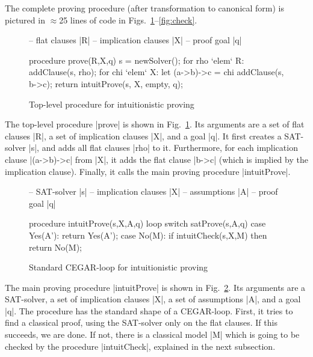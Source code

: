 \documentclass{llncs}
\begin{document}
The complete proving procedure (after transformation to canonical form) is pictured in $\approx$25 lines of code in Figs.\ \ref{fig:top-level}--\ref{fig:check}.

\begin{figure}[t]
\begin{center}
\begin{code}
-- flat clauses |R|
-- implication clauses |X|
-- proof goal |q|

procedure prove(R,X,q)
  s = newSolver();
  for rho `elem` R:
    addClause(s, rho);
  for chi `elem` X:
    let (a->b)->c = chi
    addClause(s, b->c);
  return intuitProve(s, X, empty, q);
\end{code}
\vspace{-0.7cm}\end{center}
\caption{Top-level procedure for intuitionistic proving}
\label{fig:top-level}
\end{figure}

The top-level procedure |prove| is shown in Fig.\ \ref{fig:top-level}. Its arguments are a set of flat clauses |R|, a set of implication clauses |X|, and a goal |q|. It first creates a SAT-solver |s|, and adds all flat clauses |rho| to it. Furthermore, for each implication clause |(a->b)->c| from |X|, it adds the flat clause |b->c| (which is implied by the implication clause). Finally, it calls the main proving procedure |intuitProve|.

\begin{figure}[t]
\begin{center}
\begin{code}
-- SAT-solver |s|
-- implication clauses |X|
-- assumptions |A|
-- proof goal |q|

procedure intuitProve(s,X,A,q)
  loop
    switch satProve(s,A,q)
      case Yes(A'):
        return Yes(A');
      case No(M):
        if intuitCheck(s,X,M) then
          return No(M);
\end{code}
\vspace{-0.7cm}\end{center}
\caption{Standard CEGAR-loop for intuitionistic proving}
\label{fig:intuit}
\end{figure}

The main proving procedure |intuitProve| is shown in Fig.\ \ref{fig:intuit}. Its arguments are a SAT-solver, a set of implication clauses |X|, a set of assumptions |A|, and a goal |q|. The procedure has the standard shape of a CEGAR-loop. First, it tries to find a classical proof, using the SAT-solver only on the flat clauses. If this succeeds, we are done. If not, there is a classical model |M| which is going to be checked by the procedure |intuitCheck|, explained in the next subsection.
\end{document}
